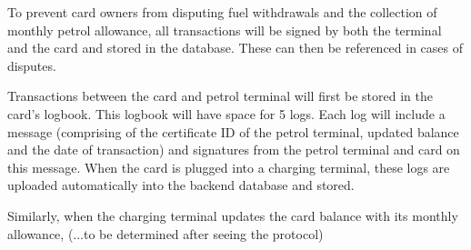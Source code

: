 To prevent card owners from disputing fuel withdrawals and the collection of monthly petrol allowance, all transactions will be signed by both the terminal and the card and stored in the database. These can then be referenced in cases of disputes.

Transactions between the card and petrol terminal will first be stored in the card's logbook. This logbook will have space for 5 logs. Each log will include a message (comprising of the certificate ID of the petrol terminal, updated balance and the date of transaction) and signatures from the petrol terminal and card on this message. When the card is plugged into a charging terminal, these logs are uploaded automatically into the backend database and stored.

Similarly, when the charging terminal updates the card balance with its monthly allowance, (...to be determined after seeing the protocol)
